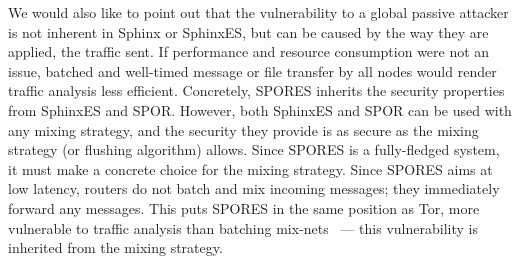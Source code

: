 We would also like to point out that the
vulnerability to a global passive attacker is not inherent in Sphinx
or SphinxES, but can be caused by the way they are applied, \ie the
traffic sent. If performance and resource consumption were not an
issue, batched and well-timed message or file transfer by all nodes
would render traffic analysis less efficient. Concretely, \Ac{SPORES} inherits 
the security properties from SphinxES and \ac{SPOR}.
However, both SphinxES and \ac{SPOR} can be used with any mixing strategy, and 
the security they provide is as secure as the mixing strategy (or flushing 
algorithm) allows.
Since \ac{SPORES} is a fully-fledged system, it must make a concrete choice for 
the mixing strategy.
Since \ac{SPORES} aims at low latency, routers do not batch and mix incoming 
messages; they immediately forward any messages.
This puts \ac{SPORES} in the same position as \ac{Tor}, \ie more vulnerable to 
traffic analysis than batching mix-nets~\cite{RoutingSurveyAnonymousProtocols} 
 --- this 
vulnerability is inherited from the mixing strategy.





